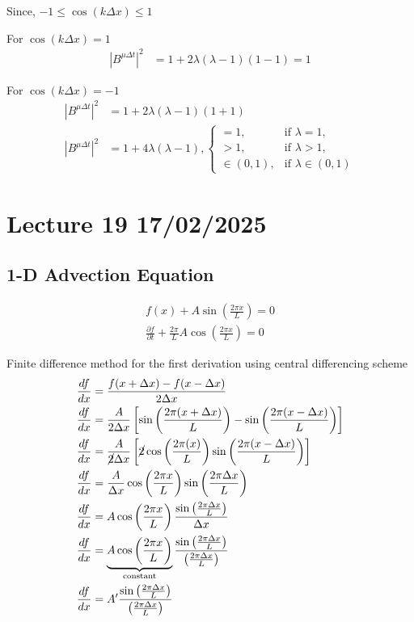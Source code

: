 \documentclass[fleqn,10pt]{SelfArx} %
\begin{document}
Since, \(-1 \leq \cos(k\Delta x) \leq 1\)

For \( \cos(k\Delta x) = 1 \)
\begin{align*}
	\left|B^{\mu\Delta t}\right|^2 &= 1 + 2\lambda(\lambda - 1)(1 - 1) = 1
\end{align*}

For \( \cos(k\Delta x) = -1 \)
\begin{align*}
	\left|B^{\mu\Delta t}\right|^2 &= 1 + 2\lambda(\lambda - 1)(1 + 1) \\
	\left|B^{\mu\Delta t}\right|^2 &= 1 + 4\lambda(\lambda - 1),
	\begin{cases}
		=1, & \text{if } \lambda = 1, \\ 
		> 1, & \text{if } \lambda > 1, \\ 
		\in (0,1), & \text{if } \lambda \in (0,1)
	\end{cases}
\end{align*}

\clearpage

\section{Lecture 19 17/02/2025}
\subsection{1-D Advection Equation}
\begin{align*}
	f(x) + A \sin\left(\frac{2\pi x}{L}\right) = 0 \tag{19.1} \label{eq:19.1} \\
	\frac{\partial f}{\partial t} + \frac{2\pi}{L}A \cos\left(\frac{2\pi x}{L}\right)  = 0 \tag{19.2} \label{eq:19.2}
\end{align*}

Finite difference method for the first derivation using central differencing scheme
\begin{align*}
	\frac{df}{dx} &=\frac{f(x + \Delta x) - f(x - \Delta x)}{2\Delta x} \\
	\frac{df}{dx} &=\frac{A}{2\Delta x}\left[\sin\left(\frac{2\pi(x + \Delta x)}{L}\right) - \sin\left(\frac{2\pi(x - \Delta x)}{L}\right)\right] \\
	\frac{df}{dx} &=\frac{A}{\cancel{2}\Delta x}\left[\cancel{2}\cos\left(\frac{2\pi(x)}{L}\right)\sin\left(\frac{2\pi(x - \Delta x)}{L}\right)\right] \\
	\frac{df}{dx} &=\frac{A}{\Delta x}\cos\left(\frac{2\pi x}{L}\right)\sin\left(\frac{2\pi \Delta x}{L}\right) \\
	\frac{df}{dx} &=A\cos\left(\frac{2\pi x}{L}\right)\frac{\sin\left(\frac{2\pi\Delta x}{L}\right)}{\Delta x} \\
	\frac{df}{dx} &=\underbrace{A\cos\left(\frac{2\pi x}{L}\right)}_{\text{constant}} \frac{\sin\left(\frac{2\pi\Delta x}{L}\right)}{\left(\frac{2\pi\Delta x}{L}\right)} \\
	\frac{df}{dx} &=A'\frac{\sin\left(\frac{2\pi\Delta x}{L}\right)}{\left(\frac{2\pi\Delta x}{L}\right)}
\end{align*}
\end{document}
